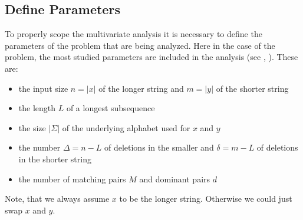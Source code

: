\subsection{Define Parameters}
To properly scope the multivariate analysis it is necessary to define the parameters of the problem that are being analyzed.
Here in the case of the \lcs{} problem, the most studied parameters are included in the analysis (see \cite{Bergroth.2000}, \cite{Paterson.1994}). 
These are:
\begin{itemize}
	\item the input size $n = |x|$ of the longer string and $m = |y|$ of the shorter string
	\item the length $L$ of a longest subsequence
	\item the size $|\Sigma|$ of the underlying alphabet used for $x$ and $y$
	\item the number $\Delta = n - L$ of deletions in the smaller and $\delta = m - L$ of deletions in the shorter string
	\item the number of matching pairs $M$ and dominant pairs $d$
\end{itemize}
Note, that we always assume $x$ to be the longer string. Otherwise we could just swap $x$ and $y$.

